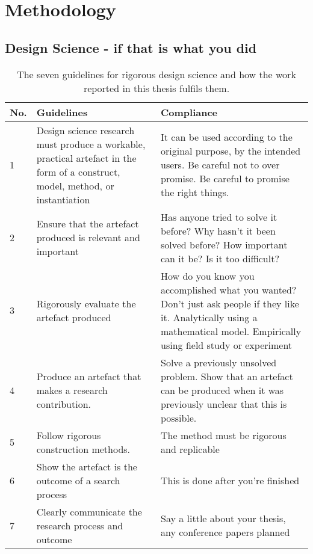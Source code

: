 \chapter{Methodology}
\label{chap:methodology}

\section{Design Science - if that is what you did}

\begin{table}[h!]
\begin{center}
 \begin{tabular}{||m{1em}|m{7cm}|m{7cm}||} 
 \hline
 No. & Guidelines & Compliance \\ [0.5ex] 
 \hline\hline
 1 & Design science research must produce a workable, practical artefact in the form of a construct, model, method, or instantiation & It can be used according to the original purpose, by the intended users. Be careful not to over promise. Be careful to promise the right things.\\
 \hline
 2 & Ensure that the artefact produced is relevant and important & Has anyone tried to solve it before? Why hasn't it been solved before? How important can it be? Is it too difficult?\\
 \hline
 3 & Rigorously evaluate the artefact produced & How do you know you accomplished what you wanted? Don't just ask people if they like it. Analytically using a mathematical model. Empirically using field study or experiment  \\
 \hline
 4 & Produce an artefact that makes a research contribution. & Solve a previously unsolved problem. Show that an artefact can be produced when it was previously unclear that this is possible.\\
 \hline
 5 & Follow rigorous construction methods. & The method must be rigorous and replicable  \\ 
 \hline
 6 & Show the artefact is the outcome of a search process & This is done after you're finished \\
 \hline
 7 & Clearly communicate the research process and outcome & Say a little about your thesis, any conference papers planned \\[1ex] 
 \hline
\end{tabular}
\caption{The seven guidelines for rigorous design science and how the work reported in this thesis fulfils them.}
\end{center}
\end{table}


